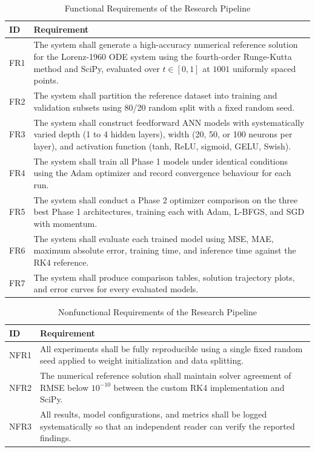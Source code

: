 \begin{table}[H]
\centering
\caption{Functional Requirements of the Research Pipeline}
\label{tab:fr}
\renewcommand{\arraystretch}{1.2}
\begin{tabular}{|p{1.2cm}|p{12.5cm}|}
\hline
\textbf{ID} & \textbf{Requirement} \\
\hline
FR1 & The system shall generate a high-accuracy numerical reference solution for the Lorenz-1960 ODE system using the fourth-order Runge-Kutta method and SciPy, evaluated over $t \in [0, 1]$ at $1001$ uniformly spaced points. \\
\hline
FR2 & The system shall partition the reference dataset into training and validation subsets using 80/20 random split with a fixed random seed. \\
\hline
FR3 & The system shall construct feedforward ANN models with systematically varied depth (1 to 4 hidden layers), width (20, 50, or 100 neurons per layer), and activation function (tanh, ReLU, sigmoid, GELU, Swish). \\
\hline
FR4 & The system shall train all Phase 1 models under identical conditions using the Adam optimizer and record convergence behaviour for each run. \\
\hline
FR5 & The system shall conduct a Phase 2 optimizer comparison on the three best Phase 1 architectures, training each with Adam, L-BFGS, and SGD with momentum. \\
\hline
FR6 & The system shall evaluate each trained model using MSE, MAE, maximum absolute error, training time, and inference time against the RK4 reference. \\
\hline
FR7 & The system shall produce comparison tables, solution trajectory plots, and error curves for every evaluated models. \\
\hline
\end{tabular}
\end{table}

\begin{table}[H]
\centering
\caption{Nonfunctional Requirements of the Research Pipeline}
\label{tab:nfr}
\renewcommand{\arraystretch}{1.2}
\begin{tabular}{|p{1.5cm}|p{12.2cm}|}
\hline
\textbf{ID} & \textbf{Requirement} \\
\hline
NFR1 & All experiments shall be fully reproducible using a single fixed random seed applied to weight initialization and data splitting. \\
\hline
NFR2 & The numerical reference solution shall maintain solver agreement of RMSE below $10^{-10}$ between the custom RK4 implementation and SciPy. \\
\hline
NFR3 & All results, model configurations, and metrics shall be logged systematically so that an independent reader can verify the reported findings. \\
\hline
\end{tabular}
\end{table}

